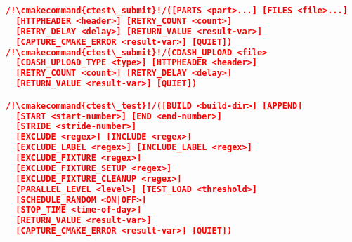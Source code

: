 \documentclass{article}
\newcommand{\cmakecommand}[1]{{\href{https://cmake.org/cmake/help/v3.13/command/#1.html}{#1}}}
\begin{document}
\begin{minipage}[t]{0.18\linewidth}
\begin{lstlisting}[language=CMake]
/!\cmakecommand{ctest\_submit}!/([PARTS <part>...] [FILES <file>...]
  [HTTPHEADER <header>] [RETRY_COUNT <count>]
  [RETRY_DELAY <delay>] [RETURN_VALUE <result-var>]
  [CAPTURE_CMAKE_ERROR <result-var>] [QUIET])
/!\cmakecommand{ctest\_submit}!/(CDASH_UPLOAD <file>
  [CDASH_UPLOAD_TYPE <type>] [HTTPHEADER <header>]
  [RETRY_COUNT <count>] [RETRY_DELAY <delay>]
  [RETURN_VALUE <result-var>] [QUIET])

/!\cmakecommand{ctest\_test}!/([BUILD <build-dir>] [APPEND]
  [START <start-number>] [END <end-number>]
  [STRIDE <stride-number>]
  [EXCLUDE <regex>] [INCLUDE <regex>]
  [EXCLUDE_LABEL <regex>] [INCLUDE_LABEL <regex>]
  [EXCLUDE_FIXTURE <regex>]
  [EXCLUDE_FIXTURE_SETUP <regex>]
  [EXCLUDE_FIXTURE_CLEANUP <regex>]
  [PARALLEL_LEVEL <level>] [TEST_LOAD <threshold>]
  [SCHEDULE_RANDOM <ON|OFF>]
  [STOP_TIME <time-of-day>]
  [RETURN_VALUE <result-var>]
  [CAPTURE_CMAKE_ERROR <result-var>] [QUIET])
\end{lstlisting}
\end{minipage}
\hfill\vline\hfill
\end{document}
